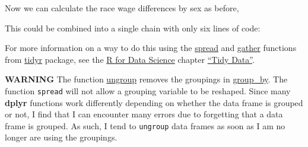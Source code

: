 \documentclass[]{book}
\newenvironment{Shaded}{\begin{snugshade}}{\end{snugshade}}
\newcommand{\KeywordTok}[1]{\textcolor[rgb]{0.13,0.29,0.53}{\textbf{#1}}}
\newcommand{\DataTypeTok}[1]{\textcolor[rgb]{0.13,0.29,0.53}{#1}}
\newcommand{\StringTok}[1]{\textcolor[rgb]{0.31,0.60,0.02}{#1}}
\newcommand{\CommentTok}[1]{\textcolor[rgb]{0.56,0.35,0.01}{\textit{#1}}}
\newcommand{\OperatorTok}[1]{\textcolor[rgb]{0.81,0.36,0.00}{\textbf{#1}}}
\newcommand{\NormalTok}[1]{#1}
\theoremstyle{definition}
\theoremstyle{definition}
\theoremstyle{definition}
\theoremstyle{remark}
\begin{document}
Now we can calculate the race wage differences by sex as before,

\begin{Shaded}
\end{Shaded}

This could be combined into a single chain with only six lines of code:

\begin{Shaded}
\end{Shaded}

For more information on a way to do this using the
\href{https://www.rdocumentation.org/packages/tidyr/topics/spread}{spread}
and
\href{https://www.rdocumentation.org/packages/tidyr/topics/gather}{gather}
functions from \href{https://cran.r-project.org/package=tidyr}{tidyr}
package, see the \href{http://r4ds.had.co.nz/}{R for Data Science}
chapter \href{http://r4ds.had.co.nz/tidy-data.html}{``Tidy Data''}.

\textbf{WARNING} The function
\href{https://www.rdocumentation.org/packages/dplyr/topics/ungroup}{ungroup}
removes the groupings in
\href{https://www.rdocumentation.org/packages/dplyr/topics/group_by}{group\_by}.
The function \texttt{spread} will not allow a grouping variable to be
reshaped. Since many \textbf{dplyr} functions work differently depending
on whether the data frame is grouped or not, I find that I can encounter
many errors due to forgetting that a data frame is grouped. As such, I
tend to \texttt{ungroup} data frames as soon as I am no longer are using
the groupings.
\end{document}
